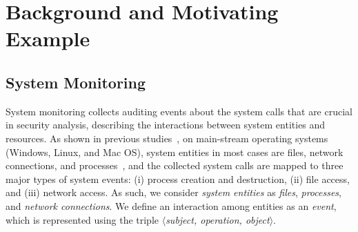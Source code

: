 
\section{Background and Motivating Example}
\subsection{System Monitoring}
System monitoring collects auditing events about the system calls that are crucial in security analysis, describing the interactions between system entities and resources.
As shown in previous studies~\cite{backtracking,backtracking2,taser,wormlog,gao2018saql,gao2018aiql,mcitracking,logtracking}, on main-stream operating systems (Windows, Linux, and Mac OS), system entities in most cases are files, network connections, and processes~\cite{backtracking,backtracking2,taser,wormlog},
and the collected system calls are mapped to three major types of system events:
(i) process creation and destruction, (ii) file access, and (iii) network access.
As such, we consider \emph{system entities} as \emph{files}, \emph{processes}, and \emph{network connections}.
We define an interaction among entities as an \emph{event}, which is represented using the triple \emph{$\langle$subject, operation, object$\rangle$}.






